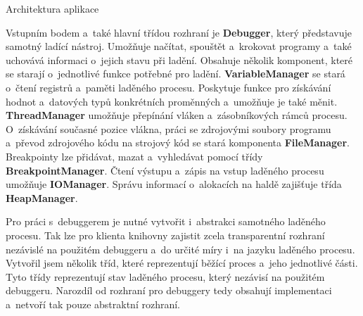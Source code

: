 \documentclass[czech,bachelor,male,python,dept460,hidelinks]{diploma}						%
\newcommand{\parspace}[1][]{
	\ifthenelse{\isempty{#1}}{\vspace{0mm}}{\vspace{#1}}
	\par
}
\begin{document}
\begin{section}{Architektura aplikace}
		\parspace Vstupním bodem a~také hlavní třídou rozhraní je \textbf{Debugger}, který představuje samotný ladící nástroj.
		Umožňuje načítat, spouštět a~krokovat programy a~také uchovává informaci o~jejich stavu při ladění. Obsahuje několik komponent, které se starají o~jednotlivé
		funkce potřebné pro ladění. \textbf{VariableManager} se stará o~čtení registrů a~paměti laděného procesu. Poskytuje funkce pro získávání hodnot
		a~datových typů konkrétních proměnných a~umožňuje je také měnit. \textbf{ThreadManager} umožňuje přepínání vláken a~zásobníkových
		rámců procesu. O~získávání současné pozice vlákna, práci se zdrojovými soubory programu a~převod zdrojového kódu na strojový kód se stará komponenta
		\textbf{FileManager}. Breakpointy lze přidávat, mazat a~vyhledávat pomocí třídy \textbf{BreakpointManager}. Čtení výstupu a~zápis na vstup laděného
		procesu umožňuje \textbf{IOManager}. Správu informací o~alokacích na haldě zajišťuje třída \textbf{HeapManager}.
		
		\parspace Pro práci s~debuggerem je nutné vytvořit i~abstrakci samotného laděného procesu. Tak lze pro klienta knihovny zajistit zcela transparentní
		rozhraní nezávislé na použitém debuggeru a~do určité míry i~na jazyku laděného procesu. Vytvořil jsem několik tříd, které reprezentují běžící proces
		a~jeho jednotlivé části. Tyto třídy reprezentují stav laděného procesu, který nezávisí na použitém debuggeru. Narozdíl od
		rozhraní pro debuggery tedy obsahují implementaci a~netvoří tak pouze abstraktní rozhraní.
		

\end{section}
\end{document}
